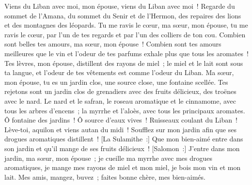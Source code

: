 \begin{multicols}{2}
Viens du Liban avec moi, mon épouse, viens du Liban avec moi~! Regarde du sommet de l'Amana, du sommet du Senir et de l'Hermon, des repaires des lions et des montagnes des léopards.
Tu me ravis le cœur, ma sœur, mon épouse, tu me ravis le cœur, par l'un de tes regards et par l'un des colliers de ton cou.
Combien sont belles tes amours, ma sœur, mon épouse~! Combien sont tes amours meilleures que le vin et l'odeur de tes parfums exhale plus que tous les aromates~!
Tes lèvres, mon épouse, distillent des rayons de miel~; le miel et le lait sont sous ta langue, et l'odeur de tes vêtements est comme l'odeur du Liban.
Ma sœur, mon épouse, tu es un jardin clos, une source close, une fontaine scellée.
Tes rejetons sont un jardin clos de grenadiers avec des fruits délicieux, des troënes avec le nard.
Le nard et le safran, le roseau aromatique et le cinnamome, avec tous les arbres d'encens~; la myrrhe et l'aloès, avec tous les principaux aromates.
Ô fontaine des jardins~! Ô source d'eaux vives~! Ruisseaux coulant du Liban~!
Lève-toi, aquilon et viens autan du midi~! Soufflez sur mon jardin afin que ses drogues aromatiques distillent~! [La Sulamithe~:] Que mon bien-aimé entre dans son jardin et qu'il mange de ses fruits délicieux~!
\VerseOne{}[Salomon~:] J'entre dans mon jardin, ma sœur, mon épouse~; je cueille ma myrrhe avec mes drogues aromatiques, je mange mes rayons de miel et mon miel, je bois mon vin et mon lait. Mes amis, mangez, buvez~; faites bonne chère, mes bien-aimés.

\end{multicols}
